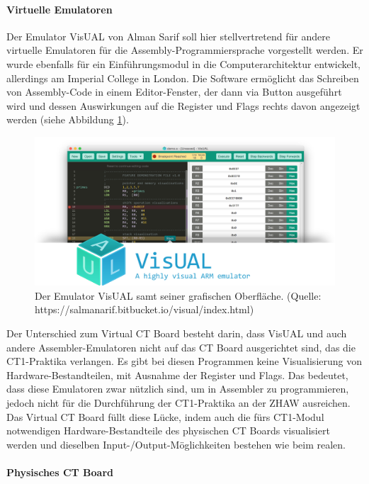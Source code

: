 \documentclass[10pt]{article}
\begin{document}
\paragraph{Virtuelle Emulatoren}
Der Emulator VisUAL von Alman Sarif soll hier stellvertretend für andere virtuelle Emulatoren für die Assembly-Programmiersprache vorgestellt werden. Er wurde ebenfalls für ein Einführungsmodul in die Computerarchitektur entwickelt, allerdings am Imperial College in London. Die Software ermöglicht das Schreiben von Assembly-Code in einem Editor-Fenster, der dann via Button ausgeführt wird und dessen Auswirkungen auf die Register und Flags rechts davon angezeigt werden (siehe Abbildung \ref{emulator}).
\begin{figure}[h]
\includegraphics[width=\textwidth]{visual_emulator}
\caption{Der Emulator VisUAL samt seiner grafischen Oberfläche. (Quelle: https://salmanarif.bitbucket.io/visual/index.html)}
\label{emulator}
\end{figure}
Der Unterschied zum \glqq Virtual CT Board\grqq{} besteht darin, dass VisUAL und auch andere Assembler-Emulatoren nicht auf das CT Board ausgerichtet sind, das die CT1-Praktika verlangen. Es gibt bei diesen Programmen keine Visualisierung von Hardware-Bestandteilen, mit Ausnahme der Register und Flags. Das bedeutet, dass diese Emulatoren zwar nützlich sind, um in Assembler zu programmieren, jedoch nicht für die Durchführung der CT1-Praktika an der ZHAW ausreichen. Das \glqq Virtual CT Board\grqq{} füllt diese Lücke, indem auch die fürs CT1-Modul notwendigen Hardware-Bestandteile des physischen CT Boards visualisiert werden und dieselben Input-/Output-Möglichkeiten bestehen wie beim realen.

\paragraph{Physisches CT Board} 
\end{document}

